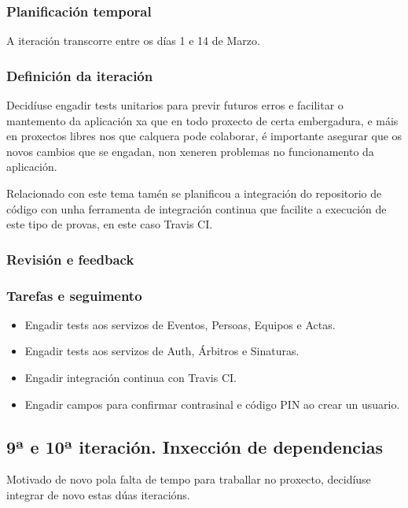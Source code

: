       \subsubsection{Planificación temporal}
      A iteración transcorre entre os días 1 e 14 de Marzo.

      \subsubsection{Definición da iteración}
      Decidíuse engadir tests unitarios para previr futuros erros e facilitar o 
mantemento da aplicación xa que en todo proxecto de certa embergadura, e máis 
en proxectos libres nos que calquera pode colaborar, é importante asegurar que 
os novos cambios que se engadan, non xeneren problemas no funcionamento da 
aplicación.

      Relacionado con este tema tamén se planificou a integración do 
repositorio de código con unha ferramenta de integración continua que facilite 
a execución de este tipo de provas, en este caso Travis CI.

      \subsubsection{Revisión e feedback}

      \subsubsection{Tarefas e seguimento}

        \begin{itemize}
         \item Engadir tests aos servizos de Eventos, Persoas, Equipos e Actas.
         \item Engadir tests aos servizos de Auth, Árbitros e Sinaturas.
         \item Engadir integración continua con Travis CI.
         \item Engadir campos para confirmar contrasinal e código PIN ao crear 
un usuario.
        \end{itemize}

    \subsection{9ª e 10ª iteración. Inxección de dependencias}
    Motivado de novo pola falta de tempo para traballar no proxecto, decidíuse 
integrar de novo estas dúas iteracións.

